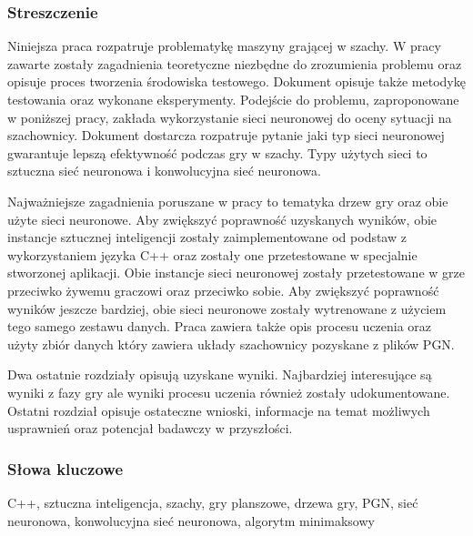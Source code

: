 \subsubsection*{Streszczenie} 
\begin{otherlanguage}{polish}
Niniejsza praca rozpatruje problematykę maszyny grającej w szachy. W pracy zawarte zostały zagadnienia teoretyczne niezbędne do zrozumienia problemu oraz opisuje proces tworzenia środowiska testowego. Dokument opisuje także metodykę testowania oraz wykonane eksperymenty. Podejście do problemu, zaproponowane w poniższej pracy, zakłada wykorzystanie sieci neuronowej do oceny sytuacji na szachownicy. Dokument dostarcza rozpatruje pytanie jaki typ sieci neuronowej gwarantuje lepszą efektywność podczas gry w szachy. Typy użytych sieci to sztuczna sieć neuronowa i konwolucyjna sieć neuronowa.

Najważniejsze zagadnienia poruszane w pracy to tematyka drzew gry oraz obie użyte sieci neuronowe. Aby zwiększyć poprawność uzyskanych wyników, obie instancje sztucznej inteligencji zostały zaimplementowane od podstaw z wykorzystaniem języka C++ oraz zostały one przetestowane w specjalnie stworzonej aplikacji. Obie instancje sieci neuronowej zostały przetestowane w grze przeciwko żywemu graczowi oraz przeciwko sobie. Aby zwiększyć poprawność wyników jeszcze bardziej, obie sieci neuronowe zostały wytrenowane z użyciem tego samego zestawu danych. Praca zawiera także opis procesu uczenia oraz użyty zbiór danych który zawiera układy szachownicy pozyskane z plików PGN.

Dwa ostatnie rozdziały opisują uzyskane wyniki. Najbardziej interesujące są wyniki z fazy gry ale wyniki procesu uczenia również zostały udokumentowane. Ostatni rozdział opisuje ostateczne wnioski, informacje na temat możliwych usprawnień oraz potencjał badawczy w przyszłości.
\end{otherlanguage}

\subsubsection*{Słowa kluczowe} 
\begin{otherlanguage}{polish}
C++, sztuczna inteligencja, szachy, gry planszowe, drzewa gry, PGN, sieć neuronowa, konwolucyjna sieć neuronowa, algorytm minimaksowy
\end{otherlanguage}

